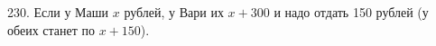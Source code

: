 230. Если у Маши $x$ рублей, у Вари их $x+300$ и надо отдать 150 рублей (у обеих станет по $x+150$).\\
